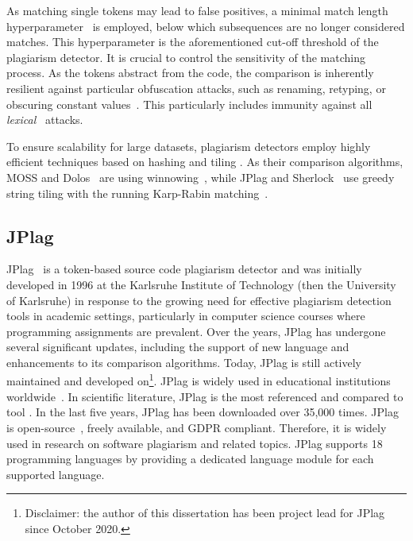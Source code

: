 As matching single tokens may lead to false positives, a minimal match length hyperparameter~\cite{prechelt2002} is employed, below which subsequences are no longer considered matches. This hyperparameter is the aforementioned cut-off threshold of the plagiarism detector. It is crucial to control the sensitivity of the matching process.
As the tokens abstract from the code, the comparison is inherently resilient against particular obfuscation attacks, such as renaming, retyping, or obscuring constant values~\cite{prechelt2002}.
This particularly includes immunity against all \textit{lexical}~\cite{Joy1999} attacks.

To ensure scalability for large datasets, plagiarism detectors employ highly efficient techniques based on hashing and tiling \cite{prechelt2002, MOSS}. As their comparison algorithms, MOSS and Dolos~\cite{Maertens2022} are using winnowing~\cite{Schleimer2003}, while JPlag and Sherlock~\cite{Joy1999} use greedy string tiling with the running Karp-Rabin matching~\cite{Wise1993, Wise1995}.

\subsection{JPlag}\label{sec:found-jplag}
JPlag~\cite{prechelt2000, prechelt2002} is a token-based source code plagiarism detector and was initially developed in 1996 at the Karlsruhe Institute of Technology (then the University of Karlsruhe) in response to the growing need for effective plagiarism detection tools in academic settings, particularly in computer science courses where programming assignments are prevalent.
Over the years, JPlag has undergone several significant updates, including the support of new language and enhancements to its comparison algorithms. Today, JPlag is still actively maintained and developed on\footnote{Disclaimer: the author of this dissertation has been project lead for JPlag since October 2020.}.
%
JPlag is widely used in educational institutions worldwide~\cite{Aniceto2021, Lancaster2004}. In scientific literature, JPlag is the most referenced and compared to tool \cite{Novak2019}.
In the last five years, JPlag has been downloaded over 35,000 times.
JPlag is open-source~\cite{JPlag_GitHub}, freely available, and \ac{GDPR} compliant. Therefore, it is widely used in research on software plagiarism and related topics.
JPlag supports 18 programming languages by providing a dedicated language module for each supported language.

